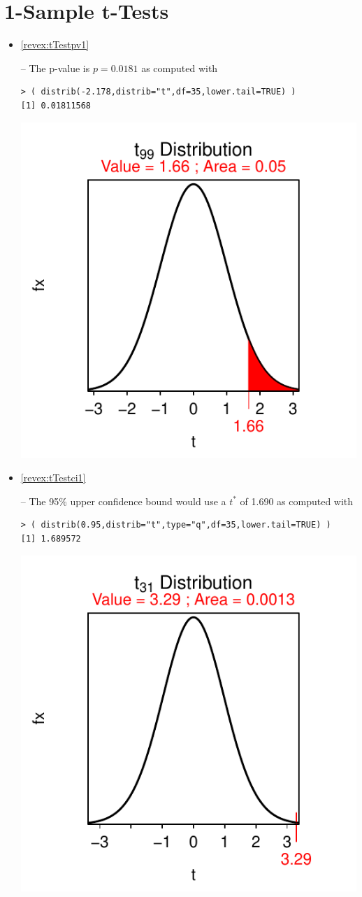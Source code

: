 \documentclass[10pt,openany]{book}\usepackage[]{graphicx}\usepackage[]{color}
\makeatletter
\newenvironment{kframe}{%
 \def\at@end@of@kframe{}%
 \ifinner\ifhmode%
  \def\at@end@of@kframe{\end{minipage}}%
  \begin{minipage}{\columnwidth}%
 \fi\fi%
 \def\FrameCommand##1{\hskip\@totalleftmargin \hskip-\fboxsep
 \colorbox{shadecolor}{##1}\hskip-\fboxsep
     \hskip-\linewidth \hskip-\@totalleftmargin \hskip\columnwidth}%
 \MakeFramed {\advance\hsize-\width
   \@totalleftmargin\z@ \linewidth\hsize
   \@setminipage}}%
 {\par\unskip\endMakeFramed%
 \at@end@of@kframe}
\newenvironment{knitrout}{}{} %
\makeatother
\begin{document}
\section*{1-Sample t-Tests}
\begin{itemize}
  \item \hypertarget{ans:tTestpv1}{\ref{revex:tTestpv1}} -- The p-value is $p=0.0181$ as computed with
\begin{knitrout}
\color{fgcolor}\begin{kframe}
\begin{verbatim}
> ( distrib(-2.178,distrib="t",df=35,lower.tail=TRUE) )
[1] 0.01811568
\end{verbatim}
\end{kframe}

{\centering \includegraphics[width=.4\linewidth]{Figs/unnamed-chunk-359-1} 

}



\end{knitrout}
  \item \hypertarget{ans:tTestci1}{\ref{revex:tTestci1}} -- The 95\% upper confidence bound would use a $t^{*}$ of 1.690 as computed with
\begin{knitrout}
\color{fgcolor}\begin{kframe}
\begin{verbatim}
> ( distrib(0.95,distrib="t",type="q",df=35,lower.tail=TRUE) )
[1] 1.689572
\end{verbatim}
\end{kframe}

{\centering \includegraphics[width=.4\linewidth]{Figs/unnamed-chunk-360-1} 

}
\end{knitrout}
\end{itemize}
\end{document}
